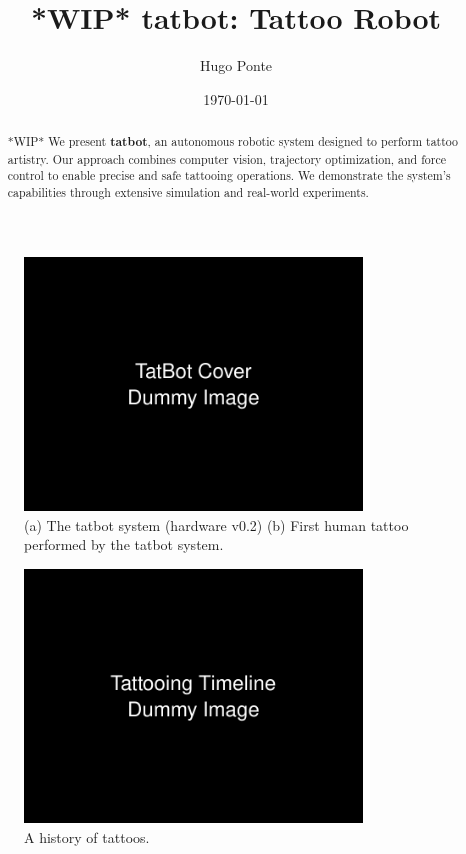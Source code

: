 \documentclass[11pt]{article}
\title{ *WIP* tatbot: Tattoo Robot}
\author{Hugo Ponte}
\date{\today}
\begin{document}
\maketitle

\begin{figure}[h]
    \centering
    \includegraphics[width=0.8\textwidth]{figures/cover.png}
    \caption{(a) The tatbot system (hardware v0.2) (b) First human tattoo performed by the tatbot system. }
    \label{fig:cover}
\end{figure}


\begin{abstract}
*WIP* We present \textbf{tatbot}, an autonomous robotic system designed to perform tattoo artistry.
Our approach combines computer vision, trajectory optimization, and force control to enable precise and safe tattooing operations.
We demonstrate the system's capabilities through extensive simulation and real-world experiments.
\end{abstract}

\pagebreak

\begin{figure}[h]
    \centering
    \includegraphics[width=0.8\textwidth]{figures/timeline.png}
    \caption{A history of tattoos.}
    \label{fig:timeline}
\end{figure}
\end{document}
